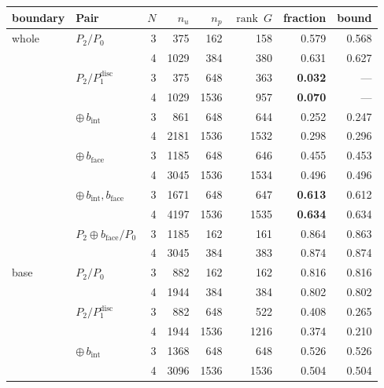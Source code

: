 \documentclass{article}
\theoremstyle{definition}
\theoremstyle{plain}
\begin{document}
\begin{table}[h]
\centering
\begin{tabular}{@{}llrrrrrr@{}}
\toprule
boundary & Pair & $N$ & $n_u$ & $n_p$ & $\operatorname{rank}~G$ & fraction & bound \\
\midrule
whole & $P_2/P_0$                 & 3 & 375  & 162  & 158  & 0.579 & 0.568 \\
      &                           & 4 & 1029 & 384  & 380  & 0.631 & 0.627 \\
      & $P_2/P_1^{\mathrm{disc}}$ & 3 & 375  & 648  & 363  & \textbf{0.032} & --- \\
      &                           & 4 & 1029 & 1536 & 957  & \textbf{0.070} & --- \\
      & $\oplus\, b_{\mathrm{int}}$
                                  & 3 & 861  & 648  & 644  & 0.252 & 0.247 \\
      &                           & 4 & 2181 & 1536 & 1532 & 0.298 & 0.296 \\
      & $\oplus\, b_{\mathrm{face}}$
                                  & 3 & 1185 & 648  & 646  & 0.455 & 0.453 \\
      &                           & 4 & 3045 & 1536 & 1534 & 0.496 & 0.496 \\
      & $\oplus\, b_{\mathrm{int}}, b_{\mathrm{face}}$
                                  & 3 & 1671 & 648  & 647  & \textbf{0.613} & 0.612 \\
      &                           & 4 & 4197 & 1536 & 1535 & \textbf{0.634} & 0.634 \\
      & $P_2 \oplus b_{\mathrm{face}}/P_0$
                                  & 3 & 1185 & 162  & 161  & 0.864 & 0.863 \\
      &                           & 4 & 3045 & 384  & 383  & 0.874 & 0.874 \\
\midrule
base  & $P_2/P_0$                 & 3 & 882  & 162  & 162  & 0.816 & 0.816 \\
      &                           & 4 & 1944 & 384  & 384  & 0.802 & 0.802 \\
      & $P_2/P_1^{\mathrm{disc}}$ & 3 & 882  & 648  & 522  & 0.408 & 0.265 \\
      &                           & 4 & 1944 & 1536 & 1216 & 0.374 & 0.210 \\
      & $\oplus\, b_{\mathrm{int}}$
                                  & 3 & 1368 & 648  & 648  & 0.526 & 0.526 \\
      &                           & 4 & 3096 & 1536 & 1536 & 0.504 & 0.504 \\

\end{tabular}
\end{table}
\end{document}
